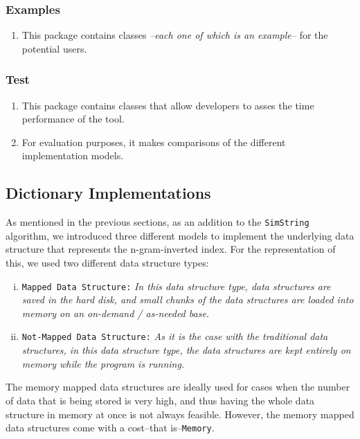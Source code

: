 \subsubsection*{Examples}
\begin{enumerate}[-]
	\item This package contains classes \textit{--each one of which is an example--} for the potential users.
\end{enumerate}

\subsubsection*{Test}
\begin{enumerate}[-]
	\item This package contains classes that allow developers to asses the time performance of the tool.
	\item For evaluation purposes, it makes comparisons of the different implementation models.
\end{enumerate}

\subsection{Dictionary Implementations}

As mentioned in the previous sections, as an addition to the \texttt{SimString} algorithm, we introduced three different models to implement the underlying data structure that represents the n-gram-inverted index. For the representation of this, we used two different data structure types:
\begin{enumerate}[i.]
	\item \texttt{Mapped Data Structure:} \textit{In this data structure type, data structures are saved in the hard disk, and small chunks of the data structures are loaded into memory on an on-demand / as-needed base.}
	\item \texttt{Not-Mapped Data Structure:} \textit{As it is the case with the traditional data structures, in this data structure type, the data structures are kept entirely on memory while the program is running.}
\end{enumerate}

The memory mapped data structures are ideally used for cases when the number of data that is being stored is very high, and thus having the whole data structure in memory at once is not always feasible. However, the memory mapped data structures come with a cost--that is--\texttt{Memory}.

